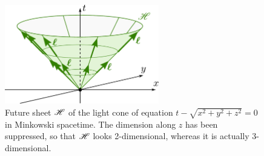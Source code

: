 \begin{figure}
\centerline{\includegraphics[width=0.6\textwidth]{def_future_light_cone.pdf}}
\caption[]{\label{f:def:future_light_cone} \footnotesize
Future sheet $\mathscr{H}$ of the light cone of equation $t-\sqrt{x^2+y^2+z^2}=0$ in Minkowski spacetime.
The dimension along $z$ has been suppressed, so that $\mathscr{H}$ looks 2-dimensional,
whereas it is actually 3-dimensional.}
\end{figure}


